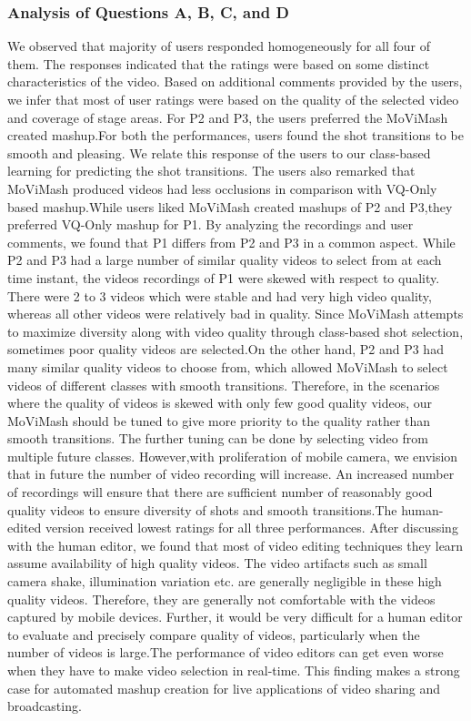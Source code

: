 \documentclass{sig-alternate}
\begin{document}
\subsubsection{Analysis of Questions A, B, C, and D}
We observed that majority of users responded homogeneously for all four of them. The responses indicated that the ratings were based on some distinct characteristics of the video. Based on additional comments provided by the users, we infer that most of user ratings were based on the quality of the selected video and coverage of stage areas. For P2 and P3, the users preferred the MoViMash created mashup.For both the performances, user\textquotesingle s found the shot transitions to be
smooth and pleasing. We relate this response of the user\textquotesingle s to our class-based learning for predicting the shot transitions. The users also remarked that MoViMash produced videos had less occlusions in comparison with VQ-Only based mashup.While users liked MoViMash created mashups of P2 and P3,they preferred VQ-Only mashup for P1. By analyzing the recordings and user comments, we found that P1 differs from P2 and P3 in a common aspect. While P2 and P3 had a large number of similar quality videos to select from at each time instant, the videos recordings of P1 were skewed with respect to quality. There were 2 to 3 videos which were stable and had very high video quality, whereas all other videos were relatively bad in quality. Since MoViMash attempts to maximize diversity along with video quality through class-based shot selection, sometimes poor quality videos are selected.On the other hand, P2 and P3 had many similar quality videos
to choose from, which allowed MoViMash to select videos of different classes with smooth transitions. Therefore, in the scenarios where the quality of videos is skewed with only few good quality videos, our MoViMash should be tuned to give more priority to the quality rather than smooth transitions. The further tuning can be done by selecting video from multiple future classes. However,with proliferation of mobile camera, we envision that in future the number of video recording will increase. An increased number of recordings will ensure that there are sufficient number of reasonably good quality videos to ensure diversity of shots and smooth transitions.The human-edited version received lowest ratings for all three performances. After discussing with the human editor, we found that most of video editing techniques they learn assume availability of high quality videos. The video artifacts such as small camera shake, illumination variation etc. are generally negligible in these high quality videos. Therefore, they are generally not comfortable with the videos captured by mobile devices. Further, it would be very difficult for a human editor to evaluate and precisely compare quality of videos, particularly when the number of videos is large.The performance of video editors can get even worse when they have to make video selection in real-time. This finding makes a strong case for automated mashup creation for live applications of video sharing and broadcasting.
\end{document}
